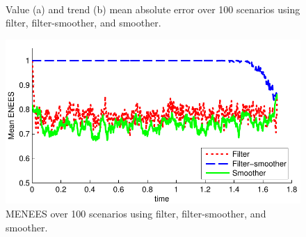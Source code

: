\documentclass[10pt,twocolumn,twoside]{IEEEtran}
\begin{document}
\begin{figure}[!t]
\centering
{} \\
\caption{Value (a) and trend (b) mean absolute error over 100 scenarios using filter, filter-smoother, and smoother.}
\label{fig:finance_rmse}
\end{figure}
%
\begin{figure}[!t]
\centering
\includegraphics[width=0.9\columnwidth]{finance_menees.pdf}
\caption{MENEES over 100 scenarios using filter, filter-smoother, and smoother.}
\label{fig:finance_menees}
\end{figure}
\end{document}
